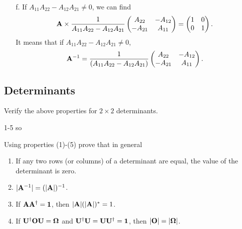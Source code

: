 \documentclass[a4paper]{book}
\newcommand{\A}{{\bf A}}
\newcommand{\U}{{\bf U}}
\newcommand{\Op}{{\bf O}}
\begin{document}
\begin{solution}
\begin{enumerate}
	\item[f.] If $A_{11}A_{22}-A_{12}A_{21}\neq 0$, we can find
	\[
		\A \times \frac{1}{A_{11}A_{22}-A_{12}A_{21}}\begin{pmatrix} A_{22} & -A_{12} \\ -A_{21} & A_{11}	\end{pmatrix} = \begin{pmatrix} 1 & 0 \\ 0 & 1 \end{pmatrix}.
	\]
	It means that if $A_{11}A_{22}-A_{12}A_{21}\neq 0$,
	\begin{equation}
		\A^{-1} = \frac{1}{ ( A_{11} A_{22} - A_{12} A_{21} ) }\begin{pmatrix} A_{22} & -A_{12} \\ -A_{21} & A_{11}	\end{pmatrix}.
	\end{equation}
		
	\end{enumerate}
	\end{solution}
	
	\subsection{Determinants}
	
	\begin{exercise}
		Verify the above properties for $2 \times 2$ determinants.
	\end{exercise}
	
	\begin{solution}
		1-5 so
	\end{solution}
	
	\begin{exercise}
	Using properties (1)-(5) prove that in general
	\begin{enumerate}

	\item If any two rows (or columns) of a determinant are equal, the value of the determinant is zero.
	
	\item $|\A^{-1}|=(|\A|)^{-1}$.
	
	\item If $\A \A^\dagger = \bf{1}$, then $|\A|(|\A|)^* = 1$.
	
	\item If $\U^\dagger \Op \U = \bf{\Omega}$ and $\U^\dagger \U = \U \U^\dagger = \bf{1}$, then $|\Op|=|\bf{\Omega}|$.

	\end{enumerate}		
	\end{exercise}
	
\end{document}
